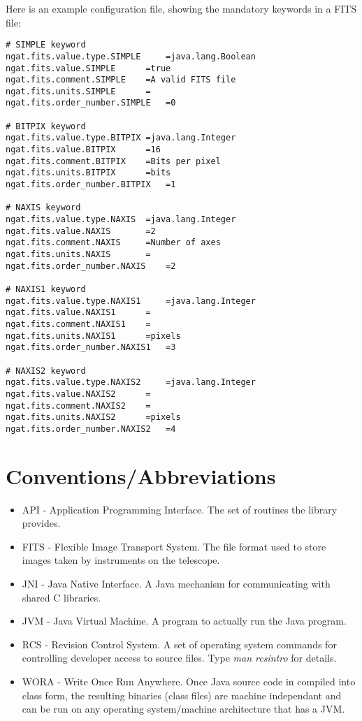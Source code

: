 \documentclass[10pt,a4paper]{article}
\begin{document}
Here is an example configuration file, showing the mandatory keywords in a FITS file:

\begin{verbatim}
# SIMPLE keyword
ngat.fits.value.type.SIMPLE 	=java.lang.Boolean
ngat.fits.value.SIMPLE 		=true
ngat.fits.comment.SIMPLE	=A valid FITS file
ngat.fits.units.SIMPLE		=
ngat.fits.order_number.SIMPLE	=0

# BITPIX keyword
ngat.fits.value.type.BITPIX	=java.lang.Integer
ngat.fits.value.BITPIX 		=16
ngat.fits.comment.BITPIX	=Bits per pixel
ngat.fits.units.BITPIX		=bits
ngat.fits.order_number.BITPIX	=1

# NAXIS keyword
ngat.fits.value.type.NAXIS	=java.lang.Integer
ngat.fits.value.NAXIS 		=2
ngat.fits.comment.NAXIS		=Number of axes
ngat.fits.units.NAXIS		=
ngat.fits.order_number.NAXIS	=2

# NAXIS1 keyword
ngat.fits.value.type.NAXIS1 	=java.lang.Integer
ngat.fits.value.NAXIS1 		=
ngat.fits.comment.NAXIS1	=
ngat.fits.units.NAXIS1		=pixels
ngat.fits.order_number.NAXIS1	=3

# NAXIS2 keyword
ngat.fits.value.type.NAXIS2 	=java.lang.Integer
ngat.fits.value.NAXIS2		=
ngat.fits.comment.NAXIS2	=
ngat.fits.units.NAXIS2		=pixels
ngat.fits.order_number.NAXIS2	=4
\end{verbatim}

\section{Conventions/Abbreviations}
\begin{itemize}
\item API - Application Programming Interface. The set of routines the library provides.
\item FITS - Flexible Image Transport System. The file format used to store images taken by instruments
	on the telescope.
\item JNI - Java Native Interface. A Java mechanism for communicating with shared C libraries.
\item JVM - Java Virtual Machine. A program to actually run the Java program.
\item RCS - Revision Control System. A set of operating system commands for controlling developer access to
source files. Type {\em man rcsintro} for details.
\item WORA - Write Once Run Anywhere. Once Java source code in compiled into class form, the resulting
	binaries (class files) are machine independant and can be run on any operating 
	system/machine architecture that has a JVM.
\end{itemize}
\end{document}
